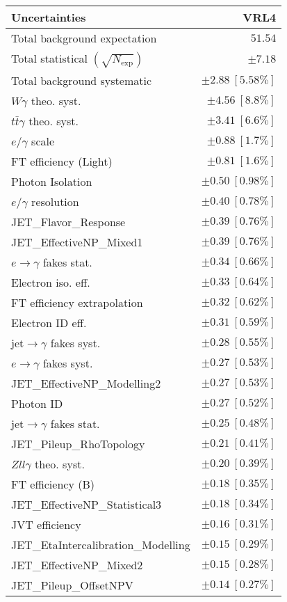 \begin{tabular}{lr}
\hline
\textbf{Uncertainties} & \textbf{VRL4} \\
\hline
Total background expectation & $51.54$ \\
\hline
Total statistical $(\sqrt{N_\mathrm{exp}})$ & $\pm 7.18$ \\
Total background systematic & $\pm 2.88\ [5.58\%]$ \\
\hline
\hline
$W\gamma$ theo. syst. & $\pm 4.56\ [8.8\%]$ \\
$t\bar{t}\gamma$ theo. syst. & $\pm 3.41\ [6.6\%]$ \\
$e/\gamma$ scale & $\pm 0.88\ [1.7\%]$ \\
FT efficiency (Light) & $\pm 0.81\ [1.6\%]$ \\
Photon Isolation & $\pm 0.50\ [0.98\%]$ \\
$e/\gamma$ resolution & $\pm 0.40\ [0.78\%]$ \\
JET\_Flavor\_Response & $\pm 0.39\ [0.76\%]$ \\
JET\_EffectiveNP\_Mixed1 & $\pm 0.39\ [0.76\%]$ \\
$e\to\gamma$ fakes stat. & $\pm 0.34\ [0.66\%]$ \\
Electron iso. eff. & $\pm 0.33\ [0.64\%]$ \\
FT efficiency extrapolation & $\pm 0.32\ [0.62\%]$ \\
Electron ID eff. & $\pm 0.31\ [0.59\%]$ \\
jet$\to\gamma$ fakes syst. & $\pm 0.28\ [0.55\%]$ \\
$e\to\gamma$ fakes syst. & $\pm 0.27\ [0.53\%]$ \\
JET\_EffectiveNP\_Modelling2 & $\pm 0.27\ [0.53\%]$ \\
Photon ID & $\pm 0.27\ [0.52\%]$ \\
jet$\to\gamma$ fakes stat. & $\pm 0.25\ [0.48\%]$ \\
JET\_Pileup\_RhoTopology & $\pm 0.21\ [0.41\%]$ \\
$Zll\gamma$ theo. syst. & $\pm 0.20\ [0.39\%]$ \\
FT efficiency (B) & $\pm 0.18\ [0.35\%]$ \\
JET\_EffectiveNP\_Statistical3 & $\pm 0.18\ [0.34\%]$ \\
JVT efficiency & $\pm 0.16\ [0.31\%]$ \\
JET\_EtaIntercalibration\_Modelling & $\pm 0.15\ [0.29\%]$ \\
JET\_EffectiveNP\_Mixed2 & $\pm 0.15\ [0.28\%]$ \\
JET\_Pileup\_OffsetNPV & $\pm 0.14\ [0.27\%]$ \\

\end{tabular}
